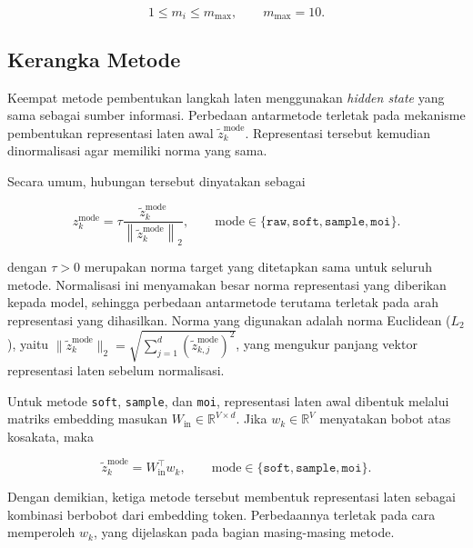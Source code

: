 \begin{equation}
1\leq m_i\leq m_{\max},
\qquad m_{\max}=10.
\label{eq:latent-actual-steps}
\end{equation}


\subsection{Kerangka Metode}
\label{subsec:kerangka-metode-laten}

Keempat metode pembentukan langkah laten menggunakan
\textit{hidden state} yang sama sebagai sumber informasi. Perbedaan
antarmetode terletak pada mekanisme pembentukan representasi laten awal
$\widetilde z_k^{\mathrm{mode}}$. Representasi tersebut kemudian
dinormalisasi agar memiliki norma yang sama.

Secara umum, hubungan tersebut dinyatakan sebagai

\begin{equation}
    z_k^{\mathrm{mode}}
    =
    \tau
    \frac{
        \widetilde z_k^{\mathrm{mode}}
    }{
        \left\|
            \widetilde z_k^{\mathrm{mode}}
        \right\|_2
    },
    \qquad
    \mathrm{mode}
    \in
    \{\texttt{raw},\texttt{soft},\texttt{sample},\texttt{moi}\}.
    \label{eq:latent-common-normalization}
\end{equation}

dengan $\tau>0$ merupakan norma target yang ditetapkan sama untuk
seluruh metode. Normalisasi ini menyamakan besar norma representasi
yang diberikan kepada model, sehingga perbedaan antarmetode terutama
terletak pada arah representasi yang dihasilkan. Norma yang digunakan
adalah norma Euclidean ($L_2$), yaitu
$\|\widetilde z_k^{\mathrm{mode}}\|_2
= \sqrt{\sum_{j=1}^{d}(\widetilde z_{k,j}^{\mathrm{mode}})^2}$,
yang mengukur panjang vektor representasi laten sebelum normalisasi.

Untuk metode \texttt{soft}, \texttt{sample}, dan \texttt{moi},
representasi laten awal dibentuk melalui matriks embedding masukan
$W_{\mathrm{in}}\in\mathbb{R}^{V\times d}$. Jika
$w_k\in\mathbb{R}^{V}$ menyatakan bobot atas kosakata, maka

\begin{equation}
    \widetilde z_k^{\mathrm{mode}}
    =
    W_{\mathrm{in}}^\top w_k,
    \qquad
    \mathrm{mode}
    \in
    \{\texttt{soft},\texttt{sample},\texttt{moi}\}.
    \label{eq:unified-embedding-mixture}
\end{equation}

Dengan demikian, ketiga metode tersebut membentuk representasi laten
sebagai kombinasi berbobot dari embedding token. Perbedaannya terletak
pada cara memperoleh $w_k$, yang dijelaskan pada bagian masing-masing
metode.

